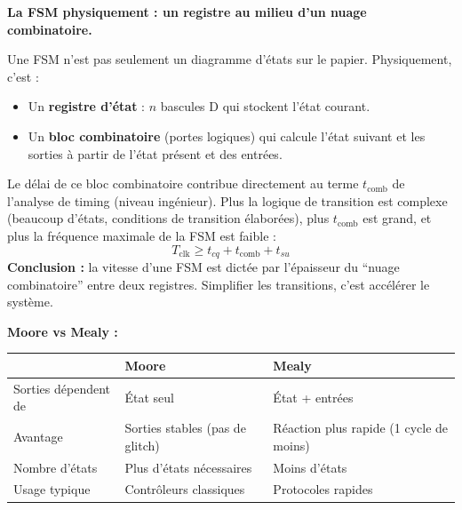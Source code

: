 \documentclass[12pt,a4paper,twoside]{book}
\begin{document}
\begin{intuition}
\textbf{La FSM physiquement : un registre au milieu d'un nuage combinatoire.}

Une FSM n'est pas seulement un diagramme d'états sur le papier. Physiquement, c'est :
\begin{itemize}[nosep]
\item Un \textbf{registre d'état} : $n$ bascules D qui stockent l'état courant.
\item Un \textbf{bloc combinatoire} (portes logiques) qui calcule l'état suivant et les sorties à partir de l'état présent et des entrées.
\end{itemize}
Le délai de ce bloc combinatoire contribue directement au terme $t_{\text{comb}}$ de l'analyse de timing (niveau ingénieur). Plus la logique de transition est complexe (beaucoup d'états, conditions de transition élaborées), plus $t_{\text{comb}}$ est grand, et plus la fréquence maximale de la FSM est faible :
\[
T_{\text{clk}} \geq t_{cq} + t_{\text{comb}} + t_{su}
\]
\textbf{Conclusion :} la vitesse d'une FSM est dictée par l'épaisseur du ``nuage combinatoire'' entre deux registres. Simplifier les transitions, c'est accélérer le système.
\end{intuition}

\begin{formule}
\textbf{Moore vs Mealy :}
\begin{center}
\renewcommand{\arraystretch}{1.3}
\begin{tabular}{p{3cm}p{5cm}p{5cm}}
\toprule
& \textbf{Moore} & \textbf{Mealy} \\
\midrule
Sorties dépendent de & État seul & État + entrées \\
Avantage & Sorties stables (pas de glitch) & Réaction plus rapide (1 cycle de moins) \\
Nombre d'états & Plus d'états nécessaires & Moins d'états \\
Usage typique & Contrôleurs classiques & Protocoles rapides \\
\bottomrule
\end{tabular}
\end{center}
\end{formule}
\end{document}
